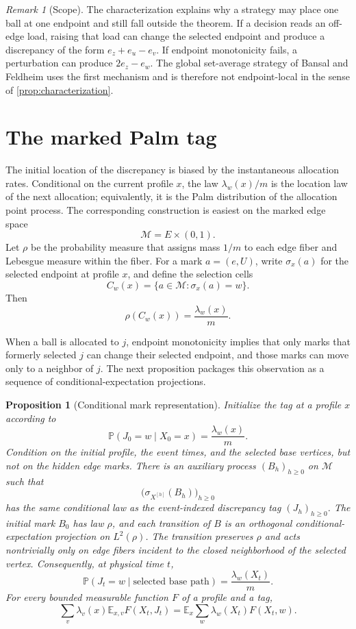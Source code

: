 \documentclass[11pt]{article}
\newtheorem{proposition}[proposition]{Proposition}
\theoremstyle{remark}
\newtheorem{remark}[remark]{Remark}
\newcommand{\E}{\mathbb{E}}
\newcommand{\Pp}{\mathbb{P}}
\newcommand{\cM}{\mathcal{M}}
\begin{document}
\begin{remark}[Scope]\label{rem:scope}
The characterization explains why a strategy may place one ball at one endpoint and still fall outside the theorem. If a decision reads an off-edge load, raising that load can change the selected endpoint and produce a discrepancy of the form $e_z+e_u-e_v$. If endpoint monotonicity fails, a perturbation can produce $2e_z-e_w$. The global set-average strategy of Bansal and Feldheim uses the first mechanism and is therefore not endpoint-local in the sense of \cref{prop:characterization}.
\end{remark}

\section{The marked Palm tag}\label{sec:palm}

The initial location of the discrepancy is biased by the instantaneous allocation rates. Conditional on the current profile $x$, the law $\lambda_w(x)/m$ is the location law of the next allocation; equivalently, it is the Palm distribution of the allocation point process. The corresponding construction is easiest on the marked edge space
\[
 \cM=E\times(0,1).
\]
Let $\rho$ be the probability measure that assigns mass $1/m$ to each edge fiber and Lebesgue measure within the fiber. For a mark $a=(e,U)$, write $\sigma_x(a)$ for the selected endpoint at profile $x$, and define the selection cells
\[
 C_w(x)=\{a\in\cM:\sigma_x(a)=w\}.
\]
Then
\[
 \rho(C_w(x))=\frac{\lambda_w(x)}m.
 \tag{3.1}\label{eq:cell-mass}
\]

When a ball is allocated to $j$, endpoint monotonicity implies that only marks that formerly selected $j$ can change their selected endpoint, and those marks can move only to a neighbor of $j$. The next proposition packages this observation as a sequence of conditional-expectation projections.

\begin{proposition}[Conditional mark representation]\label{prop:palm}
Initialize the tag at a profile $x$ according to
\[
 \Pp(J_0=w\mid X_0=x)=\frac{\lambda_w(x)}m.
 \tag{3.2}\label{eq:palm-init}
\]
Condition on the initial profile, the event times, and the selected base vertices, but not on the hidden edge marks. There is an auxiliary process $(B_h)_{h\ge0}$ on $\cM$ such that
\[
 \bigl(\sigma_{X^{[h]}}(B_h)\bigr)_{h\ge0}
\]
has the same conditional law as the event-indexed discrepancy tag $(J_h)_{h\ge0}$. The initial mark $B_0$ has law $\rho$, and each transition of $B$ is an orthogonal conditional-expectation projection on $L^2(\rho)$. The transition preserves $\rho$ and acts nontrivially only on edge fibers incident to the closed neighborhood of the selected vertex. Consequently, at physical time $t$,
\[
 \Pp(J_t=w\mid\text{selected base path})
 =\frac{\lambda_w(X_t)}m.
 \tag{3.3}\label{eq:conditional-palm}
\]
For every bounded measurable function $F$ of a profile and a tag,
\[
 \sum_v\lambda_v(x)\E_{x,v}F(X_t,J_t)
 =\E_x\sum_w\lambda_w(X_t)F(X_t,w).
 \tag{3.4}\label{eq:palm-link}
\]
\end{proposition}
\end{document}
